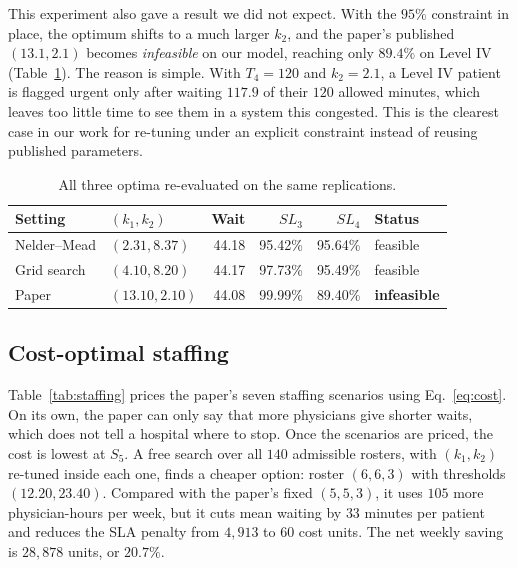 \documentclass[sigconf,nonacm]{acmart}
\begin{document}
This experiment also gave a result we did not expect. With the $95\%$
constraint in place, the optimum shifts to a much larger $k_2$, and the
paper's published $(13.1,2.1)$ becomes \emph{infeasible} on our model, reaching
only $89.4\%$ on Level IV (Table~\ref{tab:optconf}). The reason is simple. With
$T_4=120$ and $k_2=2.1$, a Level IV patient is flagged urgent only after
waiting $117.9$ of their $120$ allowed minutes, which leaves too little time to
see them in a system this congested. This is the clearest case in our work for
re-tuning under an explicit constraint instead of reusing published
parameters.

\begin{table}[t]
\caption{All three optima re-evaluated on the same replications.}
\label{tab:optconf}
\small
\begin{tabular}{@{}llrrrl@{}}
\toprule
\textbf{Setting} & $(k_1,k_2)$ & \textbf{Wait} & $SL_3$ & $SL_4$ & \textbf{Status} \\
\midrule
Nelder--Mead    & $(2.31, 8.37)$ & 44.18 & 95.42\% & 95.64\% & feasible \\
Grid search     & $(4.10, 8.20)$ & 44.17 & 97.73\% & 95.49\% & feasible \\
Paper           & $(13.10, 2.10)$& 44.08 & 99.99\% & 89.40\% & \textbf{infeasible} \\
\bottomrule
\end{tabular}
\end{table}

\subsection{Cost-optimal staffing}
\label{sec:resstaff}
Table~\ref{tab:staffing} prices the paper's seven staffing scenarios using
Eq.~\eqref{eq:cost}. On its own, the paper can only say that more physicians
give shorter waits, which does not tell a hospital where to stop. Once the
scenarios are priced, the cost is lowest at $S_5$. A free search over all $140$
admissible rosters, with $(k_1,k_2)$ re-tuned inside each one, finds a cheaper
option: roster $(6,6,3)$ with thresholds $(12.20, 23.40)$. Compared with the
paper's fixed $(5,5,3)$, it uses $105$ more physician-hours per week, but it
cuts mean waiting by $33$ minutes per patient and reduces the SLA penalty from
$4{,}913$ to $60$ cost units. The net weekly saving is $28{,}878$ units, or
$20.7\%$.
\end{document}
